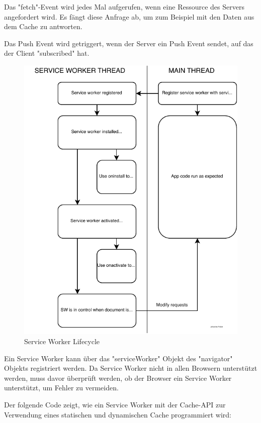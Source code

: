 
Das "fetch"-Event wird jedes Mal aufgerufen, wenn eine Ressource des Servers angefordert wird. Es fängt diese Anfrage ab, um zum Beispiel mit den Daten aus dem Cache zu antworten.


Das Push Event wird getriggert, wenn der Server ein Push Event sendet, auf das der Client "subscribed" hat.

\begin{figure}[h]
    \centering
    \includegraphics{media/ServiceWorker/lifecycle.svg.pdf}
    \caption{Service Worker Lifecycle}
\end{figure}


Ein Service Worker kann über das "serviceWorker" Objekt des "navigator" Objekts registriert werden. Da Service Worker nicht in allen Browsern unterstützt werden, muss davor überprüft werden, ob der Browser ein Service Worker unterstützt, um Fehler zu vermeiden.


\label{sec:cacheImpl}

Der folgende Code zeigt, wie ein Service Worker mit der Cache-API zur Verwendung eines statischen und dynamischen Cache programmiert wird:

